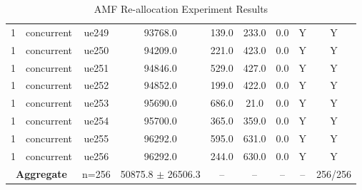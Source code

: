 \begin{table}[ht]
\begin{tabular}{|c|c|c|c|c|c|c|c|c|}
1 & concurrent & ue249 & 93768.0 & 139.0 & 233.0 & 0.0 & Y & Y \\
1 & concurrent & ue250 & 94209.0 & 221.0 & 423.0 & 0.0 & Y & Y \\
1 & concurrent & ue251 & 94846.0 & 529.0 & 427.0 & 0.0 & Y & Y \\
1 & concurrent & ue252 & 94852.0 & 199.0 & 422.0 & 0.0 & Y & Y \\
1 & concurrent & ue253 & 95690.0 & 686.0 & 21.0 & 0.0 & Y & Y \\
1 & concurrent & ue254 & 95700.0 & 365.0 & 359.0 & 0.0 & Y & Y \\
1 & concurrent & ue255 & 96292.0 & 595.0 & 631.0 & 0.0 & Y & Y \\
1 & concurrent & ue256 & 96292.0 & 244.0 & 630.0 & 0.0 & Y & Y \\
\multicolumn{2}{|c|}{\textbf{Aggregate}} & n=256 & 50875.8 $\pm$ 26506.3 & -- & -- & -- & -- & 256/256 \\
\hline
\end{tabular}
\caption{AMF Re-allocation Experiment Results}
\label{tab:amf_realloc}
\end{table}
